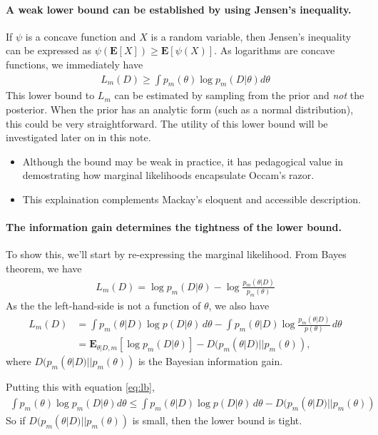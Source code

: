 \documentclass[10pt,a4paper]{article}
\begin{document}
\paragraph{A weak lower bound can be established by using Jensen's inequality.} If $\psi$ is a concave function and $X$ is a random variable, then Jensen's inequality can be expressed as $\psi(\mathbf{E}[X ] ) \geq \mathbf{E}[\psi(X)]$. As logarithms are concave functions, we immediately have
\begin{align}
L_m(D) \geq \int p_m(\theta) \log  p_m(D|\theta) d\theta 
\label{eq:lb}
\end{align}
This lower bound to $L_m$ can be estimated by sampling from the prior and \emph{not} the posterior. When the prior has an analytic form (such as a normal distribution), this could be very straightforward. The utility of this lower bound will be investigated later on in this note.

\begin{itemize}
\item Although the bound may be weak in practice, it has pedagogical value in demostrating how marginal likelihoods encapsulate Occam's razor.
\item This explaination complements Mackay's eloquent and accessible description.
\end{itemize}



\paragraph{The information gain determines the tightness of the lower bound.} To show this, we'll start by re-expressing the marginal likelihood. From Bayes theorem, we have
\begin{align}
L_m(D) = \log p_m(D | \theta) - \log \frac{p_m(\theta | D)}{p_m(\theta)}
\end{align}
As the the left-hand-side is not a function of $\theta$, we also have
\begin{align}
L_m(D) &=\int  p_m(\theta | D) \log p(D | \theta) \, d\theta - \int  p_m(\theta | D) \log \frac{p_m(\theta | D)}{p(\theta)} \, d\theta \\
&= \mathbf{E}_{\theta|D,m} \left[ \log p_m(D|\theta) \right ]  - D(p_m(\theta | D) || p_m(\theta) ),
\end{align}
where $ D(p_m(\theta | D) || p_m(\theta) )$ is the Bayesian information gain.

Putting this with equation \ref{eq:lb},
\begin{align}
\int p_m(\theta) \log  p_m(D|\theta) d\theta \leq \int p_m(\theta | D) \log p(D | \theta) \, d\theta  - D(p_m(\theta | D) || p_m(\theta) )
\end{align}
So if $D(p_m(\theta | D) || p_m(\theta) )$ is small, then the lower bound is tight. 
\end{document}
